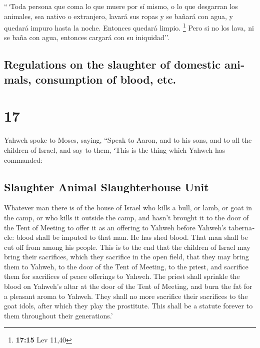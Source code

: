\begin{paracol}{2}
 ``\,`Toda persona que coma lo que muere por sí mismo, o
lo que desgarran los animales, sea nativo o extranjero, lavará sus ropas
y se bañará con agua, y quedará impuro hasta la noche. Entonces quedará
limpio. \footnote{\textbf{17:15} Lev 11,40}  Pero si no
los lava, ni se baña con agua, entonces cargará con su iniquidad''.

\switchcolumn
\begin{otherlanguage}{english}

\hypertarget{regulations-on-the-slaughter-of-domestic-animals-consumption-of-blood-etc.}{%
\subsection{Regulations on the slaughter of domestic animals,
consumption of blood,
etc.}\label{regulations-on-the-slaughter-of-domestic-animals-consumption-of-blood-etc.}}

\hypertarget{section-33}{%
\section{17}\label{section-33}}

 Yahweh spoke to Moses, saying,  ``Speak to
Aaron, and to his sons, and to all the children of Israel, and say to
them, `This is the thing which Yahweh has commanded:

\hypertarget{slaughter-animal-slaughterhouse-unit}{%
\subsection{Slaughter Animal Slaughterhouse
Unit}\label{slaughter-animal-slaughterhouse-unit}}

 Whatever man there is of the house of Israel who kills a
bull, or lamb, or goat in the camp, or who kills it outside the camp,
 and hasn't brought it to the door of the Tent of Meeting
to offer it as an offering to Yahweh before Yahweh's tabernacle: blood
shall be imputed to that man. He has shed blood. That man shall be cut
off from among his people.  This is to the end that the
children of Israel may bring their sacrifices, which they sacrifice in
the open field, that they may bring them to Yahweh, to the door of the
Tent of Meeting, to the priest, and sacrifice them for sacrifices of
peace offerings to Yahweh.  The priest shall sprinkle the
blood on Yahweh's altar at the door of the Tent of Meeting, and burn the
fat for a pleasant aroma to Yahweh.  They shall no more
sacrifice their sacrifices to the goat idols, after which they play the
prostitute. This shall be a statute forever to them throughout their
generations.'


\end{otherlanguage}
\end{paracol}

